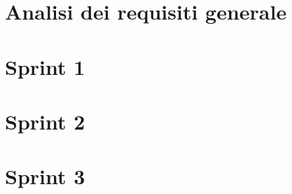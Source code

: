 \documentclass{llncs}           %
\newcommand{\labelsec}[1]{\label{sec:#1}}
\newcommand{\labelssec}[1]{\label{ssec:#1}}
\begin{document}
\section{Analisi dei requisiti generale}\labelsec{req_analysis}


\section{Sprint 1}\labelsec{sprint1}


\section{Sprint 2}\labelsec{sprint2}


\section{Sprint 3}\labelsec{sprint3}







\end{document}
